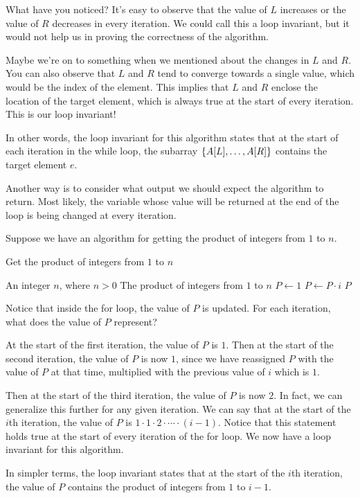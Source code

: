 \begin{example}
    What have you noticed? It's easy to observe that the value of $L$ increases or the value of $R$ decreases in every iteration. We could call this a loop invariant, but it would not help us in proving the correctness of the algorithm.

    Maybe we're on to something when we mentioned about the changes in $L$ and $R$. You can also observe that $L$ and $R$ tend to converge towards a single value, which would be the index of the element. This implies that $L$ and $R$ enclose the location of the target element, which is always true at the start of every iteration. This is our loop invariant!

    In other words, the loop invariant for this algorithm states that at the start of each iteration in the while loop, the subarray $\left\{A[L], \ldots, A[R]\right\}$ contains the target element $e$.
\end{example}

Another way is to consider what output we should expect the algorithm to return. Most likely, the variable whose value will be returned at the end of the loop is being changed at every iteration.

\begin{example}
    Suppose we have an algorithm for getting the product of integers from $1$ to $n$.
    \begin{algorithm}[H]
        \caption{Get the product of integers from $1$ to $n$ }
        \begin{algorithmic}[1]
            \Require An integer $n$, where $n>0$ 
            \Ensure The product of integers from $1$ to $n$ 
            \State $P \gets 1$
            \State $P \gets P \cdot i$ 
            \EndFor
            \Return $P$
            \EndFunction
        \end{algorithmic}
    \end{algorithm}

    Notice that inside the for loop, the value of $P$ is updated. For each iteration, what does the value of $P$ represent? 

    At the start of the first iteration, the value of $P$ is $1$. Then at the start of the second iteration, the value of $P$ is now $1$, since we have reassigned $P$ with the value of $P$ at that time, multiplied with the previous value of $i$ which is $1$. 

    Then at the start of the third iteration, the value of $P$ is now $2$. In fact, we can generalize this further for any given iteration. We can say that at the start of the $i$th iteration, the value of $P$ is $1 \cdot 1 \cdot 2 \cdot \cdots \cdot (i-1)$. Notice that this statement holds true at the start of every iteration of the for loop. We now have a loop invariant for this algorithm.

    In simpler terms, the loop invariant states that at the start of the $i$th iteration, the value of $P$ contains the product of integers from $1$ to $i-1$.
\end{example}

